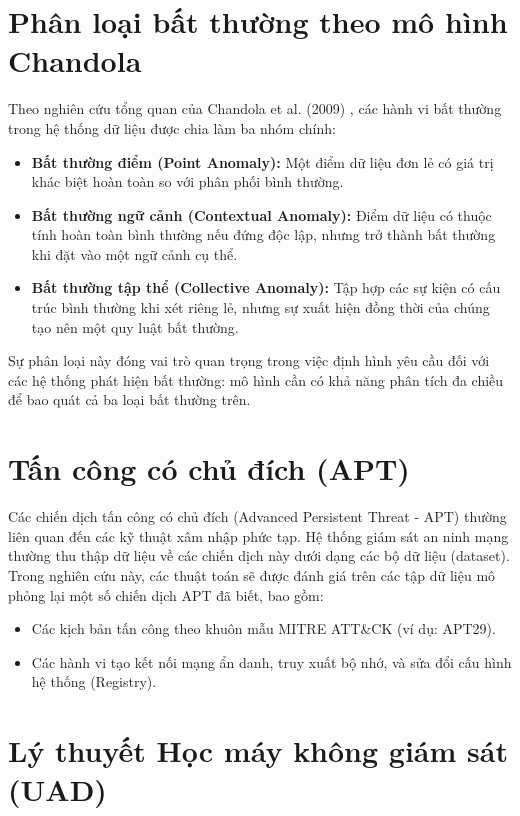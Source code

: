\documentclass[../main.tex]{subfiles}
\begin{document}
\section{Phân loại bất thường theo mô hình Chandola}
\label{section:1.3}
Theo nghiên cứu tổng quan của Chandola et al. (2009) \cite{chandola2009anomaly}, các hành vi bất thường trong hệ thống dữ liệu được chia làm ba nhóm chính:
\begin{itemize}
    \item \textbf{Bất thường điểm (Point Anomaly):} Một điểm dữ liệu đơn lẻ có giá trị khác biệt hoàn toàn so với phân phối bình thường.
    \item \textbf{Bất thường ngữ cảnh (Contextual Anomaly):} Điểm dữ liệu có thuộc tính hoàn toàn bình thường nếu đứng độc lập, nhưng trở thành bất thường khi đặt vào một ngữ cảnh cụ thể.
    \item \textbf{Bất thường tập thể (Collective Anomaly):} Tập hợp các sự kiện có cấu trúc bình thường khi xét riêng lẻ, nhưng sự xuất hiện đồng thời của chúng tạo nên một quy luật bất thường.
\end{itemize}

Sự phân loại này đóng vai trò quan trọng trong việc định hình yêu cầu đối với các hệ thống phát hiện bất thường: mô hình cần có khả năng phân tích đa chiều để bao quát cả ba loại bất thường trên.

\section{Tấn công có chủ đích (APT)}
\label{section:1.4}
Các chiến dịch tấn công có chủ đích (Advanced Persistent Threat - APT) thường liên quan đến các kỹ thuật xâm nhập phức tạp. Hệ thống giám sát an ninh mạng thường thu thập dữ liệu về các chiến dịch này dưới dạng các bộ dữ liệu (dataset). Trong nghiên cứu này, các thuật toán sẽ được đánh giá trên các tập dữ liệu mô phỏng lại một số chiến dịch APT đã biết, bao gồm:
\begin{itemize}
    \item Các kịch bản tấn công theo khuôn mẫu MITRE ATT\&CK (ví dụ: APT29).
    \item Các hành vi tạo kết nối mạng ẩn danh, truy xuất bộ nhớ, và sửa đổi cấu hình hệ thống (Registry).
\end{itemize}

\section{Lý thuyết Học máy không giám sát (UAD)}
\label{section:1.5}
\end{document}
